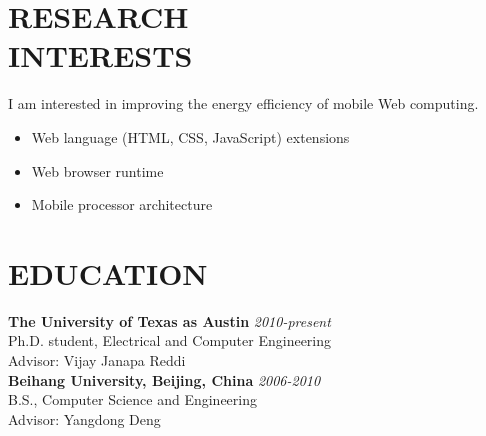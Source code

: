 \documentclass[margin, 9pt]{res} %
\begin{document}
\begin{resume}

 


\section{RESEARCH\\ INTERESTS} 

I am interested in improving the energy efficiency of mobile Web computing.
 
\begin{itemize}[noitemsep, leftmargin=*]
	\item Web language (HTML, CSS, JavaScript) extensions
	\item Web browser runtime
	\item Mobile processor architecture
\end{itemize} 


\section{EDUCATION}

\textbf{The University of Texas as Austin} \hfill\textit{2010-present}\\
Ph.D. student, Electrical and Computer Engineering\\
Advisor: Vijay Janapa Reddi\\

\textbf{Beihang University, Beijing, China} \hfill\textit{2006-2010}\\
B.S., Computer Science and Engineering\\
Advisor: Yangdong Deng\\


\end{resume}
\end{document}
